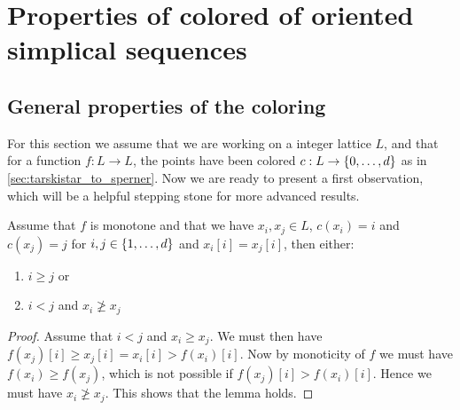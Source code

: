 \section{Properties of colored of oriented simplical sequences}

\subsection{General properties of the coloring}

For this section we assume that we are working on a integer lattice $L$, and that for a function $f : L \rightarrow L$, the points have been colored $c : L \rightarrow \left\{0, \dots, d\right\}$ as in \cref{sec:tarskistar_to_sperner}. Now we are ready to present a first observation, which will be a helpful stepping stone for more advanced results.

\begin{lemma}
	\label{lem:monotone_coloring}
	Assume that $f$ is monotone and that we have $x_i, x_j \in L$, $c(x_i) = i$ and $c(x_j) = j$ for $i, j \in \left\{1, \dots, d\right\}$ and $x_i[i] = x_j[i]$, then either:
	\begin{enumerate}
		\item $i \geq j$ or
		\item $i < j$  and $x_i \not\geq x_j$
	\end{enumerate}
\end{lemma}
\begin{proof}
	Assume that $i < j$ and $x_i \geq x_j$. We must then have $f(x_j)[i] \geq x_j[i] = x_i[i] > f(x_i)[i]$. Now by monoticity of $f$ we must have $f(x_i) \geq f(x_j)$, which is not possible if $f(x_j)[i] > f(x_i)[i]$. Hence we must have $x_i \not\geq x_j$. This shows that the lemma holds.
\end{proof}

